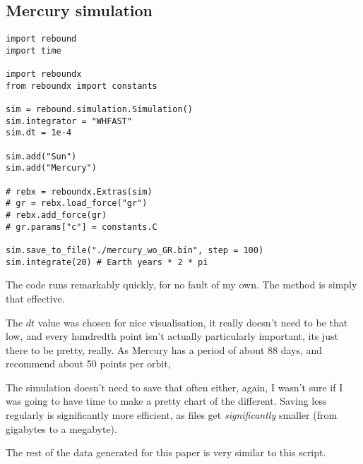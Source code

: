 \subsection{Mercury simulation}
\label{appendix: mercury}
\begin{verbatim}
import rebound
import time
    
import reboundx
from reboundx import constants
    
sim = rebound.simulation.Simulation()
sim.integrator = "WHFAST"
sim.dt = 1e-4
    
sim.add("Sun")
sim.add("Mercury")
    
# rebx = reboundx.Extras(sim)
# gr = rebx.load_force("gr")
# rebx.add_force(gr)
# gr.params["c"] = constants.C
    
sim.save_to_file("./mercury_wo_GR.bin", step = 100)
sim.integrate(20) # Earth years * 2 * pi
\end{verbatim}
The code runs remarkably quickly, for no fault of my own. The method is simply that effective.

The $dt$ value was chosen for nice visualisation, it really doesn't need to be that low, and every hundredth point isn't actually particularly important, its just there to be pretty, really. As Mercury has a period of about 88 days, and \cite{Rein_2015} recommend about 50 points per orbit, 

The simulation doesn't need to save that often either, again, I wasn't sure if I was going to have time to make a pretty chart of the different. Saving less regularly is significantly more efficient, as files get \textit{significantly} smaller (from gigabytes to a megabyte). 

The rest of the data generated for this paper is very similar to this script.